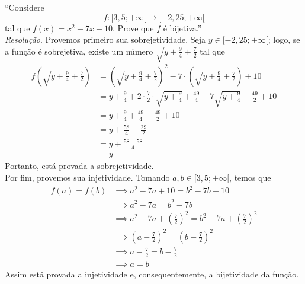 \enquote{Considere 
\begin{displaymath}
    f: [3,5; +\infty[ \rightarrow  [-2,25; + \infty[
\end{displaymath}
tal que $f(x) = x^2 - 7x + 10$. Prove que $f$ é bijetiva.}
\\ \emph{Resolução}. Provemos primeiro sua sobrejetividade. Seja $y \in [-2,25; + \infty[$; logo, se a função é sobrejetiva, existe um número $\sqrt{y + \frac{9}{4}} + \frac{7}{2}$ tal que
\begin{align*}
    f(\sqrt{y + \frac{9}{4}} + \frac{7}{2}) & = (\sqrt{y + \frac{9}{4}} + \frac{7}{2})^2 - 7 \cdot (\sqrt{y + \frac{9}{4}} + \frac{7}{2}) + 10 \\ & =
    y + \frac{9}{4} + 2\cdot\frac{7}{2}\cdot \sqrt{y + \frac{9}{4}} + \frac{49}{4} -7\sqrt{y + \frac{9}{4}} - \frac{49}{2} + 10 \\ & =
    y + \frac{9}{4} + \frac{49}{4} - \frac{49}{2} + 10 \\ & =
    y + \frac{58}{4} - \frac{29}{2} \\ & =
    y + \frac{58 - 58}{4} \\ & =
    y
\end{align*}
Portanto, está provada a sobrejetividade. \\
Por fim, provemos sua injetividade. Tomando $a, b \in [3,5; +\infty[$, temos que
\begin{align*}
    f(a) = f(b) & \implies a^2 - 7a + 10 = b^2 - 7b + 10 \\ & \implies
    a^2 - 7a = b^2 - 7b \\ & \implies
    a^2 - 7a + (\frac{7}{2})^2 = b^2 - 7a + (\frac{7}{2})^2 \\ & \implies
    (a - \frac{7}{2})^2 = (b - \frac{7}{2})^2 \\ & \implies
    a - \frac{7}{2} = b - \frac{7}{2} \\ & \implies
    a = b
\end{align*}
Assim está provada a injetividade e, consequentemente, a bijetividade da função.